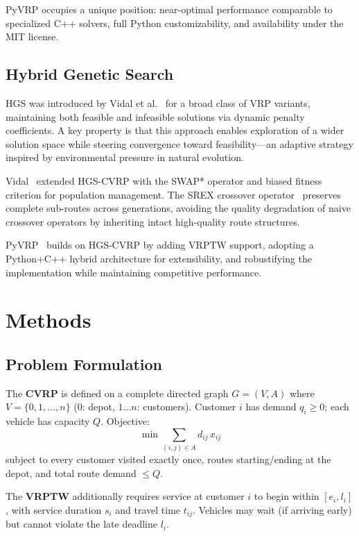 \documentclass[conference]{IEEEtran}
\begin{document}
PyVRP occupies a unique position: near-optimal performance comparable to
specialized C++ solvers, full Python customizability, and availability under
the MIT license.

\subsection{Hybrid Genetic Search}

HGS was introduced by Vidal et al.~\cite{vidal2013hybrid} for a broad class
of VRP variants, maintaining both feasible and infeasible solutions via
dynamic penalty coefficients. A key property is that this approach enables
exploration of a wider solution space while steering convergence toward
feasibility---an adaptive strategy inspired by environmental pressure in
natural evolution.

Vidal~\cite{vidal2022hybrid} extended HGS-CVRP with the SWAP* operator and
biased fitness criterion for population management. The SREX crossover
operator~\cite{nagata2010memetic} preserves complete sub-routes across
generations, avoiding the quality degradation of naive crossover operators
by inheriting intact high-quality route structures.

PyVRP~\cite{wouda2024pyvrp} builds on HGS-CVRP by adding VRPTW support,
adopting a Python+C++ hybrid architecture for extensibility, and
robustifying the implementation while maintaining competitive performance.

\section{Methods}

\subsection{Problem Formulation}

The \textbf{CVRP} is defined on a complete directed graph $G=(V,A)$ where
$V=\{0,1,\ldots,n\}$ (0: depot, $1\ldots n$: customers). Customer $i$ has
demand $q_i\geq 0$; each vehicle has capacity $Q$. Objective:
\begin{equation}
  \min \sum_{(i,j)\in A} d_{ij}\,x_{ij}
\end{equation}
subject to every customer visited exactly once, routes starting/ending at
the depot, and total route demand $\leq Q$.

The \textbf{VRPTW} additionally requires service at customer $i$ to begin
within $[e_i, l_i]$, with service duration $s_i$ and travel time $t_{ij}$.
Vehicles may wait (if arriving early) but cannot violate the late deadline
$l_i$.
\end{document}
